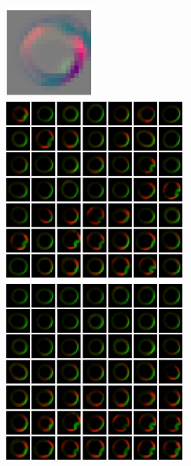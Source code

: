 \documentclass[12pt]{article}
\begin{document}
\begin{figure}
\includegraphics[width=3cm]{eigenimage_4}\\
\includegraphics[width=6cm]{image_array}
\includegraphics[width=6cm]{image_array_ordered}
\end{figure}
\end{document}
